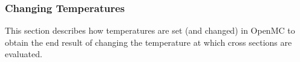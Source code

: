 \documentclass[10pt]{article}
\newcommand{\beq}{\begin{equation}}
\newcommand{\eeq}{\end{equation}}
\newcounter{subsubsubsection}[subsubsection]
\numberwithin{equation}{section} %
\begin{document}

\subsubsection{Changing Temperatures}
This section describes how temperatures are set (and changed) in OpenMC to obtain the end result of changing the temperature at which cross sections are evaluated.
\end{document}
